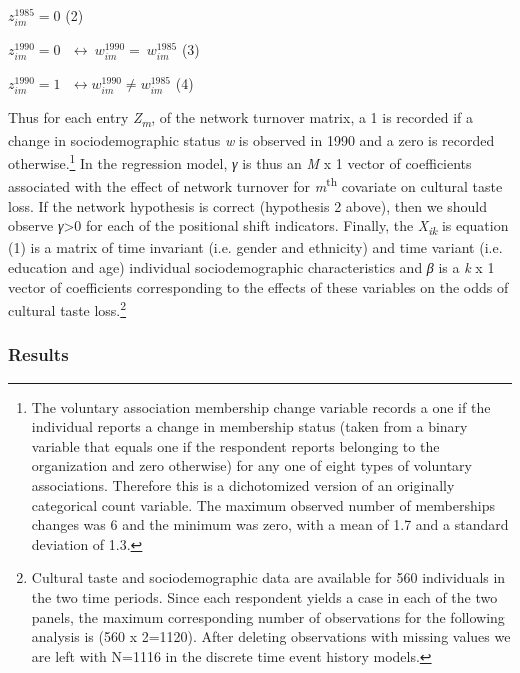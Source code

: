 \(z_{im}^{1985} = 0\) (2)

\(z_{im}^{1990} = 0\ \ \ \overset{}{\leftrightarrow}\ w_{im}^{1990} = \ w_{im}^{1985}\) (3)

\(z_{im}^{1990} = 1\ \ \ \overset{}{\leftrightarrow}w_{im}^{1990} \neq w_{im}^{1985}\) (4)

Thus for each entry \emph{Z\textsubscript{m}}, of the network turnover matrix, a 1 is recorded if a change in sociodemographic status \emph{w} is observed in 1990 and a zero is recorded otherwise.\footnote{The voluntary association membership change variable records a one if the individual reports a change in membership status (taken from a binary variable that equals one if the respondent reports belonging to the organization and zero otherwise) for any one of eight types of voluntary associations. Therefore this is a dichotomized version of an originally categorical count variable. The maximum observed number of memberships changes was 6 and the minimum was zero, with a mean of 1.7 and a standard deviation of 1.3.} In the regression model, \emph{γ} is thus an \emph{M} x 1 vector of coefficients associated with the effect of network turnover for \emph{m}\textsuperscript{th} covariate on cultural taste loss. If the network hypothesis is correct (hypothesis 2 above), then we should observe \emph{γ}\textgreater0 for each of the positional shift indicators. Finally, the \emph{X\textsubscript{ik}} is equation (1) is a matrix of time invariant (i.e. gender and ethnicity) and time variant (i.e. education and age) individual sociodemographic characteristics and \emph{β} is a \emph{k} x 1 vector of coefficients corresponding to the effects of these variables on the odds of cultural taste loss.\footnote{Cultural taste and sociodemographic data are available for 560 individuals in the two time periods. Since each respondent yields a case in each of the two panels, the maximum corresponding number of observations for the following analysis is (560 x 2=1120). After deleting observations with missing values we are left with N=1116 in the discrete time event history models.}

\subsubsection{Results}\label{results}

